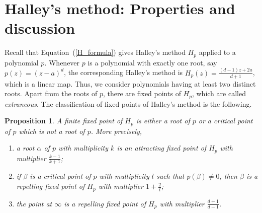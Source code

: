 \documentclass[12pt]{article}
\newtheorem{prop}{Proposition}[section]
\begin{document}
\section{Halley's method: Properties and discussion}\label{Sect-2}
Recall that Equation~(\ref{H_formula}) gives Halley's method $H_p$ applied to a polynomial $p$. Whenever $p$ is a polynomial with exactly one root, say $p(z)=(z-a)^d$, the corresponding Halley's method is $H_p(z)=\frac{(d-1)z+2a}{d+1}$, which is a linear map. Thus, we consider polynomials having at least two distinct roots. Apart from the roots of $p$, there are fixed points of $H_p$, which are called \textit{extraneous}. The classification of fixed points of Halley's method is the following.
\begin{prop}\label{prop_f.pts}
A finite fixed point of $H_{p}$ is either a root of $p$ or a critical point of $p$ which is not a root of $p$.
More precisely,
\begin{enumerate}
\item a root $\alpha$ of $p$ with multiplicity $k$ is an attracting fixed point of $H_{p}$ with multiplier $\frac{k-1}{k+1}$;
\item if $\beta$ is a critical point of $p$ with multiplicity $l$ such that $p(\beta) \neq 0$, then $\beta$ is a repelling fixed point of $ H_p $ with multiplier $1+\frac{2}{l}$;
\item the point at $\infty$ is a repelling fixed point of $H_p$ with multiplier $\frac{d+1}{d-1}$.
\end{enumerate}
\end{prop}
\end{document}
